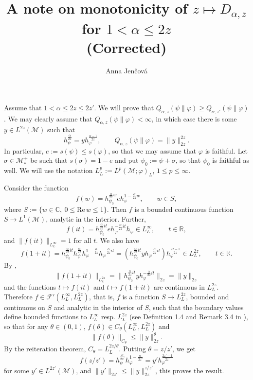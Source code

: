 \documentclass[12pt]{article}
\title{A note on monotonicity of  $z\mapsto D_{\alpha,z}$ for $1<\alpha\le 2z$\\
(Corrected)}
\author{Anna Jen\v cov\'a}
\theoremstyle{definition}
\theoremstyle{remark}
\def\Me{\mathcal M}
\def\Fe{\mathcal F}
\begin{document}
\maketitle



Assume that $1<\alpha\le 2z\le 2z'$. 
We will prove that $Q_{\alpha,z}(\psi\|\varphi)\ge Q_{\alpha,z'}(\psi\|\varphi)$. We may
clearly assume that $Q_{\alpha,z}(\psi\|\varphi)<\infty$, in which case there is some
$y\in L^{2z}(\Me)$ such that
\[
h_\psi^{\frac{\alpha}{2z}}=yh_\varphi^{\frac{\alpha-1}{2z}},\qquad
Q_{\alpha,z}(\psi\|\varphi)=\|y\|_{2z}^{2z}.
\]
In particular, $e:=s(\psi)\le s(\varphi)$, so that we may assume that $\varphi$ is
faithful. Let $\sigma\in \Me_*^+$ be such that
$s(\sigma)=1-e$ and put $\psi_0:=\psi+\sigma$, so that $\psi_0$ is faithful as well. We will use the notation
$L^p_L:=L^p(\Me;\varphi)_L$, $1\le p\le \infty$.

Consider the function 
\[
f(w)=h_{\psi_0}^{\frac{\alpha}{2z}w}eh_\varphi^{1-\frac{\alpha}{2z}w},\qquad w\in S,
\]
where $S:=\{w\in \mathbb C,\ 0\le \mathrm{Re}\,w\le 1\}$. Then $f$ is a bounded continuous
function $S\to L^1(\Me)$, analytic in the interior. Further, 
\[
f(it)=h_{\psi_0}^{\frac{\alpha}{2z}it}eh_\varphi^{-\frac{\alpha}{2z}it}h_\varphi\in
L^\infty_L,\qquad t\in \mathbb R,
\]
and $\|f(it)\|_{L^\infty_L}=1$ for all $t$.
We also have 
\[
f(1+it)=h_{\psi_0}^{\frac{\alpha}{2z}it}h_\psi^{\frac{\alpha}{2z}}h_\varphi^{1-\frac{\alpha}{2z}}h_\varphi^{-\frac{\alpha}{2z}it}=
(h_{\psi_0}^{\frac{\alpha}{2z}it}yh_\varphi^{-\frac{\alpha}{2z}it})h_\varphi^{\frac{2z-1}{2z}}\in
L^{2z}_L,\qquad t\in \mathbb R.
\]
By \cite[Lemmas 10.1 and 10.2]{kosaki1984applications}, 
\[
 \|f(1+it)\|_{L^{2z}_L}=\|h_{\psi_0}^{\frac{\alpha}{2z}it}yh_\varphi^{-\frac{\alpha}{2z}it}\|_{2z}=\|y\|_{2z}
\]
and the functions $t\mapsto f(it)$ and $t\mapsto f(1+it)$ are continuous in $L^{2z}_L$. 
Therefore $f\in \Fe'(L^\infty_L, L^{2z}_L)$, that is, $f$ is a function $S\to L^{2z}_L$,
bounded and  continuous on $S$ and analytic in the interior of $S$, such that the boundary
values define  bounded functions to $L^\infty_L$ resp. $L^{2z}_L$ (see Definition 1.4 and Remark 3.4 in
\cite{kosaki1984applications}), so that for any $\theta\in (0,1)$, $f(\theta)\in
C_\theta(L^\infty_L,L^{2z}_L)$ and 
\[
\|f(\theta)\|_{C_\theta}\le \|y\|_{2z}^\theta.
\]
By the reiteration theorem, $C_\theta=L^{2z/\theta}_L$. Putting $\theta=z/z'$, we get
\[
f(z/z')=h_{\psi}^{\frac{\alpha}{2z'}}h_\varphi^{1-\frac{\alpha}{2z'}}=y'h_\varphi^{\frac{2z'-1}{2z'}}
\]
for some $y'\in L^{2z'}(\Me)$, and  $\|y'\|_{2z'}\le \|y\|_{2z}^{z/z'}$, this proves the result.
\end{document}
